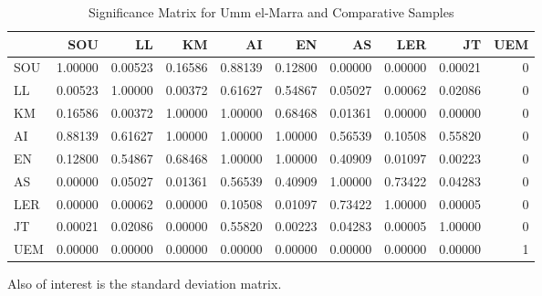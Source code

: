 \documentclass[]{book}
\begin{document}
\begin{table}

\caption{\label{tab:unnamed-chunk-4}Significance Matrix for Umm el-Marra and Comparative Samples}
\centering
\begin{tabular}[t]{l|r|r|r|r|r|r|r|r|r}
\hline
  & SOU & LL & KM & AI & EN & AS & LER & JT & UEM\\
\hline
SOU & 1.00000 & 0.00523 & 0.16586 & 0.88139 & 0.12800 & 0.00000 & 0.00000 & 0.00021 & 0\\
\hline
LL & 0.00523 & 1.00000 & 0.00372 & 0.61627 & 0.54867 & 0.05027 & 0.00062 & 0.02086 & 0\\
\hline
KM & 0.16586 & 0.00372 & 1.00000 & 1.00000 & 0.68468 & 0.01361 & 0.00000 & 0.00000 & 0\\
\hline
AI & 0.88139 & 0.61627 & 1.00000 & 1.00000 & 1.00000 & 0.56539 & 0.10508 & 0.55820 & 0\\
\hline
EN & 0.12800 & 0.54867 & 0.68468 & 1.00000 & 1.00000 & 0.40909 & 0.01097 & 0.00223 & 0\\
\hline
AS & 0.00000 & 0.05027 & 0.01361 & 0.56539 & 0.40909 & 1.00000 & 0.73422 & 0.04283 & 0\\
\hline
LER & 0.00000 & 0.00062 & 0.00000 & 0.10508 & 0.01097 & 0.73422 & 1.00000 & 0.00005 & 0\\
\hline
JT & 0.00021 & 0.02086 & 0.00000 & 0.55820 & 0.00223 & 0.04283 & 0.00005 & 1.00000 & 0\\
\hline
UEM & 0.00000 & 0.00000 & 0.00000 & 0.00000 & 0.00000 & 0.00000 & 0.00000 & 0.00000 & 1\\
\hline
\end{tabular}
\end{table}

Also of interest is the standard deviation matrix.
\end{document}
